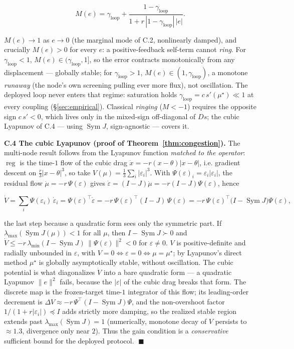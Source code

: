 \documentclass[11pt]{article}
\theoremstyle{plain}
\numberwithin{equation}{section}
\begin{document}
\[
M(e)=\gamma_{\mathrm{loop}}+\frac{1-\gamma_{\mathrm{loop}}}{1+r\,|1-\gamma_{\mathrm{loop}}|\,|e|}.
\]

$M(e)\to 1$ as $e\to0$ (the marginal mode of C.2, nonlinearly damped), and crucially $M(e)>0$ for every $e$: a positive-feedback self-term cannot \emph{ring}. For $\gamma_{\mathrm{loop}}<1$, $M(e)\in(\gamma_{\mathrm{loop}},1]$, so the error contracts monotonically from any displacement — globally stable; for $\gamma_{\mathrm{loop}}>1$, $M(e)\in(1,\gamma_{\mathrm{loop}})$, a monotone \emph{runaway} (the node's own screening pulling ever more flux), not oscillation. The deployed loop never enters that regime: saturation holds $\gamma_{\mathrm{loop}}=c\,s'(\mu^\star)\ll1$ at every coupling (§\ref{sec:empirical}). Classical \emph{ringing} ($M<-1$) requires the opposite sign $c\,s'<0$, which lives only in the mixed-sign off-diagonal of $Ds$; the cubic Lyapunov of C.4 — using $\operatorname{Sym}J$, sign-agnostic — covers it.

\textbf{C.4 The cubic Lyapunov (proof of Theorem~\ref{thm:congestion}).} The multi-node result follows from the Lyapunov function \emph{matched to the operator}: $\operatorname{reg}$ is the time-$1$ flow of the cubic drag $\dot x=-r(x-\theta)|x-\theta|$, i.e. gradient descent on $\tfrac{r}{3}|x-\theta|^3$, so take $V(\mu)=\tfrac13\sum_i |\varepsilon_i|^3$. With $\Psi(\varepsilon)_i=\varepsilon_i|\varepsilon_i|$, the residual flow $\dot\mu=-r\,\Psi(\varepsilon)$ gives $\dot\varepsilon=(I-J)\dot\mu=-r(I-J)\Psi(\varepsilon)$, hence

\[
\dot V=\sum_i\Psi(\varepsilon_i)\,\dot\varepsilon_i=\Psi(\varepsilon)^{\!\top}\dot\varepsilon
=-r\,\Psi(\varepsilon)^{\!\top}(I-J)\,\Psi(\varepsilon)
=-r\,\Psi(\varepsilon)^{\!\top}\big(I-\operatorname{Sym}J\big)\Psi(\varepsilon),
\]

the last step because a quadratic form sees only the symmetric part. If $\lambda_{\max}(\operatorname{Sym} J(\mu))<1$ for all $\mu$, then $I-\operatorname{Sym}J\succ0$ and $\dot V\le -r\,\lambda_{\min}(I-\operatorname{Sym}J)\,\|\Psi(\varepsilon)\|^2<0$ for $\varepsilon\neq0$. $V$ is positive-definite and radially unbounded in $\varepsilon$, with $V=0\Leftrightarrow\varepsilon=0\Leftrightarrow\mu=\mu^\star$; by Lyapunov's direct method $\mu^\star$ is globally asymptotically stable, without oscillation. The cubic potential is what diagonalizes $\dot V$ into a bare quadratic form — a quadratic Lyapunov $\|e\|^2$ fails, because the $|\varepsilon|$ of the cubic drag breaks that form. The discrete map is the frozen-target time-$1$ integrator of this flow; its leading-order decrement is $\Delta V\approx-r\,\Psi^{\!\top}(I-\operatorname{Sym}J)\Psi$, and the non-overshoot factor $1/(1+r|\varepsilon_i|)\preceq I$ adds strictly more damping, so the realized stable region extends past $\lambda_{\max}(\operatorname{Sym}J)=1$ (numerically, monotone decay of $V$ persists to $\approx1.3$, divergence only near $2$). Thus the gain condition is a \emph{conservative} sufficient bound for the deployed protocol. $\;\blacksquare$
\end{document}
